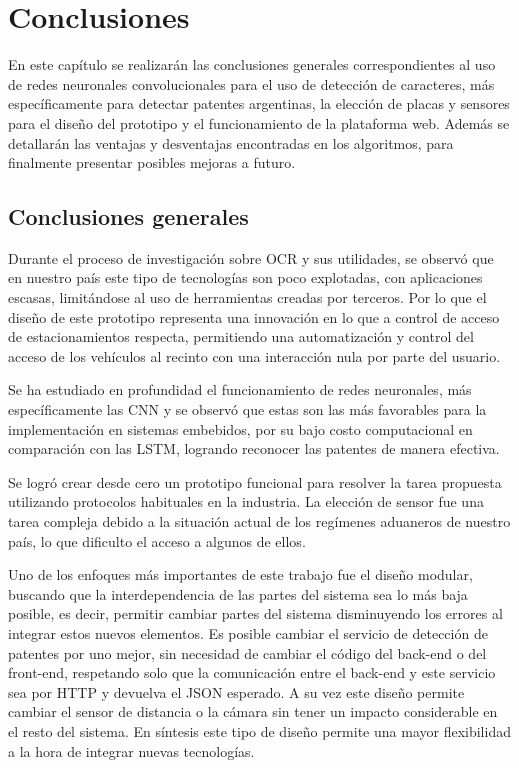 \chapter{Conclusiones}
En este capítulo se realizarán las conclusiones generales correspondientes al uso de redes neuronales convolucionales para el uso de detección de caracteres, más específicamente para detectar patentes argentinas, la elección de placas y sensores para el diseño del prototipo y el funcionamiento de la plataforma web. Además se detallarán las ventajas y desventajas encontradas en los algoritmos, para finalmente presentar posibles mejoras a futuro.

\section{Conclusiones generales}

Durante el proceso de investigación sobre OCR y sus utilidades, se observó que en nuestro país este tipo de tecnologías son poco explotadas, con aplicaciones escasas, limitándose al uso de herramientas creadas por terceros.
Por lo que el diseño de este prototipo representa una innovación en lo que a control de acceso de estacionamientos respecta, permitiendo una automatización y control del acceso de los vehículos al recinto con una interacción nula por parte del usuario.

Se ha estudiado en profundidad el funcionamiento de redes neuronales, más específicamente las CNN y se observó que estas son las más favorables para la implementación en sistemas embebidos, por su bajo costo computacional en comparación con las LSTM, logrando reconocer las patentes de manera efectiva.

Se logró crear desde cero un prototipo funcional para resolver la tarea propuesta utilizando protocolos habituales en la industria.
La elección de sensor fue una tarea compleja debido a la situación actual de los regímenes aduaneros de nuestro país, lo que dificulto el acceso a algunos de ellos.

Uno de los enfoques más importantes de este trabajo fue el diseño modular, buscando que la interdependencia de las partes del sistema sea lo más baja posible, es decir, permitir cambiar partes del sistema disminuyendo los errores al integrar estos nuevos elementos.
Es posible cambiar el servicio de detección de patentes por uno mejor, sin necesidad de cambiar el código del back-end o del front-end, respetando solo que la comunicación entre el back-end y este servicio sea por HTTP y devuelva el JSON esperado.
A su vez este diseño permite cambiar el sensor de distancia o la cámara sin tener un impacto considerable en el resto del sistema.
En síntesis este tipo de diseño permite una mayor flexibilidad a la hora de integrar nuevas tecnologías.

